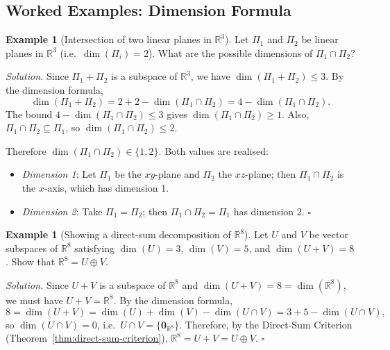 \documentclass[11pt, a4paper, notitlepage]{report}
\theoremstyle{definition}
\newtheorem{example}[theorem]{Example}
\theoremstyle{remark}
\begin{document}
\subsection{Worked Examples: Dimension Formula}

\begin{example}[Intersection of two linear planes in $\mathbb{R}^3$]\label{ex:dim-intersection-planes}
Let $\Pi_1$ and $\Pi_2$ be linear planes in $\mathbb{R}^3$ (i.e.\ $\dim(\Pi_i)=2$). What are the possible dimensions of $\Pi_1\cap\Pi_2$?

\emph{Solution.} Since $\Pi_1 + \Pi_2$ is a subspace of $\mathbb{R}^3$, we have $\dim(\Pi_1+\Pi_2)\le 3$. By the dimension formula,
\[
  \dim(\Pi_1+\Pi_2) = 2 + 2 - \dim(\Pi_1\cap\Pi_2) = 4 - \dim(\Pi_1\cap\Pi_2).
\]
The bound $4 - \dim(\Pi_1\cap\Pi_2)\le 3$ gives $\dim(\Pi_1\cap\Pi_2)\ge 1$. Also, $\Pi_1\cap\Pi_2\subseteq\Pi_1$, so $\dim(\Pi_1\cap\Pi_2)\le 2$.

Therefore $\dim(\Pi_1\cap\Pi_2)\in\{1,2\}$. Both values are realised:
\begin{itemize}
  \item \emph{Dimension 1}: Let $\Pi_1$ be the $xy$-plane and $\Pi_2$ the $xz$-plane; then $\Pi_1\cap\Pi_2$ is the $x$-axis, which has dimension 1.
  \item \emph{Dimension 2}: Take $\Pi_1 = \Pi_2$; then $\Pi_1\cap\Pi_2 = \Pi_1$ has dimension 2. $\square$
\end{itemize}
\end{example}

\begin{example}[Showing a direct-sum decomposition of $\mathbb{R}^8$]\label{ex:dim-direct-sum-R8}
Let $U$ and $V$ be vector subspaces of $\mathbb{R}^8$ satisfying $\dim(U)=3$, $\dim(V)=5$, and $\dim(U+V)=8$. Show that $\mathbb{R}^8 = U\oplus V$.

\emph{Solution.} Since $U+V$ is a subspace of $\mathbb{R}^8$ and $\dim(U+V)=8=\dim(\mathbb{R}^8)$, we must have $U+V=\mathbb{R}^8$. By the dimension formula,
\[
  8 = \dim(U+V) = \dim(U)+\dim(V)-\dim(U\cap V) = 3+5-\dim(U\cap V),
\]
so $\dim(U\cap V)=0$, i.e.\ $U\cap V = \{\mathbf{0}_{\mathbb{R}^8}\}$. Therefore, by the Direct-Sum Criterion (Theorem~\ref{thm:direct-sum-criterion}), $\mathbb{R}^8 = U+V = U\oplus V$. $\square$
\end{example}
\end{document}
